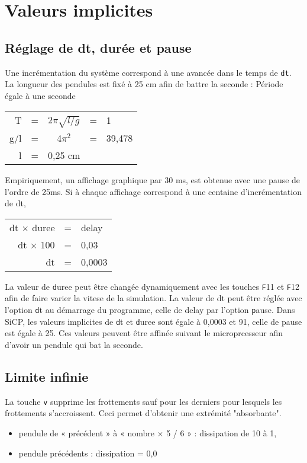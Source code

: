 %
\section{Valeurs implicites}
%
%
\subsection{Réglage de dt, durée et pause}
Une incrémentation du système correspond à une avancée dans le temps de \texttt{dt}. La longueur des pendules est fixé à 25 cm afin de battre la seconde :
Période égale à une seconde
\begin{center}
	\begin{tabular}{rcccl}
	T & = & 2$\pi \sqrt{l/g}$ & = & 1\\
	g/l & = & 4$\pi^2$ & = & 39,478\\
	l & = & 0,25 cm &\\
	\end{tabular}
\end{center}
Empiriquement, un affichage graphique par 30 ms, est obtenue avec une pause de l'ordre de 25ms. Si à chaque affichage correspond à une centaine d'incrémentation de dt, 
\begin{center}
	\begin{tabular}{rcl}
	dt $\times$ duree & = & delay\\
	dt $\times$ 100 & = & 0,03\\
	dt & = & 0,0003\\
	\end{tabular}
\end{center}
La valeur de {\texttt duree} peut être changée dynamiquement avec les touches {\texttt F11} et {\texttt F12} afin de faire varier la vitese de la simulation. La valeur de dt peut être réglée avec l'option {\texttt dt} au démarrage du programme, celle de delay par l'option {\texttt pause}.
Dans SiCP, les valeurs implicites de {\texttt dt} et {\texttt duree} sont égale à 0,0003 et 91, celle de pause est égale à 25. Ces valeurs peuvent être affinée suivant le microprcesseur afin d'avoir un pendule qui bat la seconde.
%
%
\subsection{Limite infinie}
La touche {\texttt v} supprime les frottements sauf pour les derniers pour lesquels les frottements s'accroissent. Ceci permet d'obtenir une extrémité "absorbante".
\begin{itemize}[label=, leftmargin=2cm]
\item pendule de  « précédent »  à  «  nombre $\times$ 5 / 6 » : dissipation de 10 à 1,
\item pendule précédents : dissipation = 0,0
\end{itemize}
%
%
